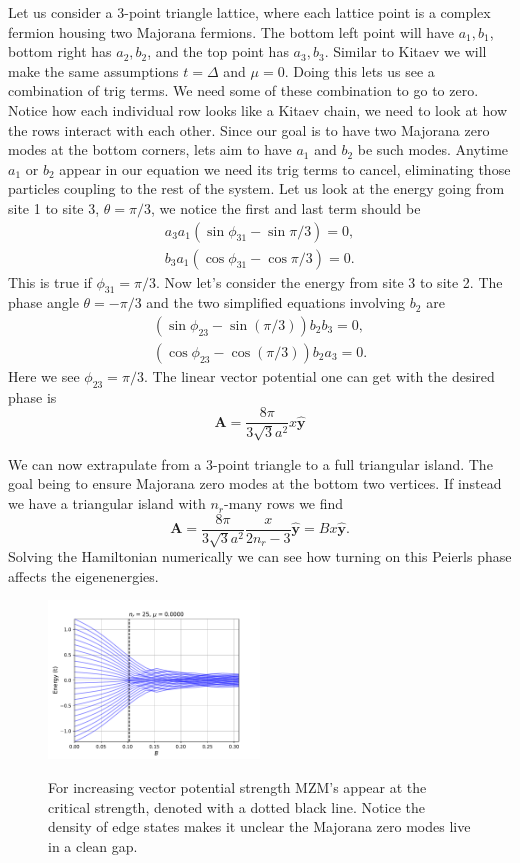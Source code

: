 \documentclass[aps,prb,showpacs,amsmath,amssymb,superscriptaddress]{revtex4-2}
\let\oldhat\hat
\renewcommand{\hat}[1]{\oldhat{\mathbf{#1}}}
\renewcommand{\vec}[1]{\mathbf{#1}}
\newcommand{\de}{\Delta}
\begin{document}
Let us consider a 3-point triangle lattice, where each lattice point is a complex fermion housing two Majorana fermions.
The bottom left point will have $a_1, b_1$, bottom right has $a_2, b_2$, and the top point has $a_3, b_3$.
Similar to Kitaev we will make the same assumptions $t=\de$ and $\mu=0$.
Doing this lets us see a combination of trig terms.
We need some of these combination to go to zero.
Notice how each individual row looks like a Kitaev chain, we need to look at how the rows interact with each other.
Since our goal is to have two Majorana zero modes at the bottom corners, lets aim to have $a_1$ and $b_2$ be such modes.
Anytime $a_1$ or $b_2$ appear in our equation we need its trig terms to cancel, eliminating those particles coupling to the rest of the system.
Let us look at the energy going from site 1 to site 3, $\theta = \pi/3$, we notice the first and last term should be
\begin{align}
  a_3 a_1 (\sin\phi_{31} - \sin\pi/3) = 0, \\
  b_3 a_1 (\cos\phi_{31} - \cos\pi/3) = 0.
\end{align}
This is true if $\phi_{31} = \pi/3$.
Now let's consider the energy from site 3 to site 2.
The phase angle $\theta = -\pi/3$ and the two simplified equations involving $b_2$ are
\begin{align}
  (\sin\phi_{23} - \sin(\pi/3)) b_2 b_3 = 0, \nonumber \\
  (\cos\phi_{23} - \cos(\pi/3)) b_2 a_3 = 0. \nonumber
\end{align}
Here we see $\phi_{23} = \pi/3$.
The linear vector potential one can get with the desired phase is
\begin{equation}
  \vec{A} = \dfrac{8 \pi}{3 \sqrt{3} a^2} x \hat{y}
\end{equation}

We can now extrapulate from a 3-point triangle to a full triangular island.
The goal being to ensure Majorana zero modes at the bottom two vertices.
If instead we have a triangular island with $n_r$-many rows we find
\begin{equation}
  \vec{A} = \dfrac{8 \pi}{3 \sqrt{3} a^2} \dfrac{x}{2n_r-3} \hat{y} = Bx\hat{y}.
\end{equation}
Solving the Hamiltonian numerically we can see how turning on this Peierls phase affects the eigenenergies.
\begin{figure}[]
\includegraphics[width=0.5\textwidth]{./figures/nr-25-w-0-spectral-flow.pdf}
\label{fig: full-triangle-spectral}
\caption{For increasing vector potential strength MZM's appear at the critical strength, denoted with a dotted black line. Notice the density of edge states makes it unclear the Majorana zero modes live in a clean gap.}
\end{figure}
\end{document}
